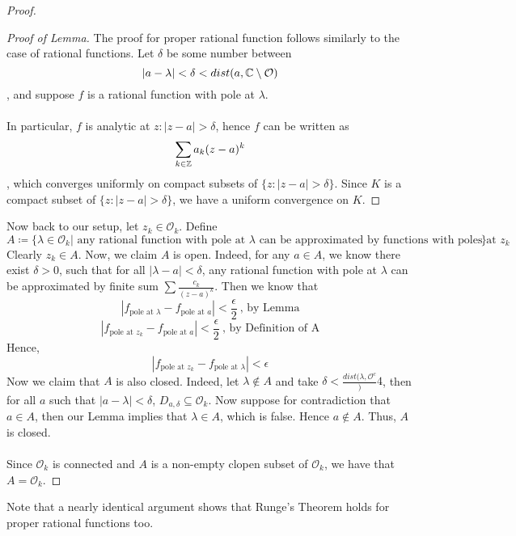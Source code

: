 \documentclass{article}
\begin{document}
\begin{proof}
\begin{proof}[Proof of Lemma]
    The proof for proper rational function follows similarly to the case of rational functions. Let $\delta$ be some number between
    \[|a - \lambda| < \delta < dist(a, \mathbb{C} \setminus \mathcal{O})\]
    , and suppose $f$ is a rational function with pole at $\lambda$.\\\\
    In particular, $f$ is analytic at $z: |z - a| > \delta$, hence $f$ can be written as
    \[\sum_{k \in \mathbb{Z}} a_k (z - a)^k\]
    , which converges uniformly on compact subsets of $\{z: |z - a| > \delta\}$. Since $K$ is a compact subset of $\{z: |z - a| > \delta\}$, we have a uniform convergence on $K$.
    \end{proof}
Now back to our setup, let $z_k \in \mathcal{O}_k$. Define
\[A \coloneqq \{\lambda \in \mathcal{O}_k | \text{ any rational function with pole at $\lambda$ can be approximated by functions with poles at $z_k$}\}\]
Clearly $z_k \in A$. Now, we claim $A$ is open. Indeed, for any $a \in A$, we know there exist $\delta > 0$, such that for all $|\lambda - a| < \delta$, any rational function with pole at $\lambda$ can be approximated by finite sum $\sum \frac{c_k}{(z - a)^k}$. Then we know that
\[|f_{\text{pole at $\lambda$}} - f_{\text{pole at $a$}}| < \frac{\epsilon}{2}\ \text{, by Lemma}\]
\[|f_{\text{pole at $z_k$}} - f_{\text{pole at $a$}}| < \frac{\epsilon}{2}\ \text{, by Definition of A}\]
Hence, 
\[|f_{\text{pole at $z_k$}} - f_{\text{pole at $\lambda$}}| < \epsilon\]
Now we claim that $A$ is also closed. Indeed, let $\lambda \notin A$ and take $\delta < \frac{dist(\lambda, \mathcal{O}^c}){4}$, then for all $a$ such that $|a - \lambda| < \delta$, $D_{a, \delta} \subseteq \mathcal{O}_k$. Now suppose for contradiction that $a \in A$, then our Lemma implies that $\lambda \in A$, which is false. Hence $a \notin A$. Thus, $A$ is closed.\\\\
Since $\mathcal{O}_k$ is connected and $A$ is a non-empty clopen subset of $\mathcal{O}_k$, we have that $A = \mathcal{O}_k$.
\end{proof}

\begin{remark}
    Note that a nearly identical argument shows that Runge's Theorem holds for proper rational functions too.
\end{remark}
\end{document}
